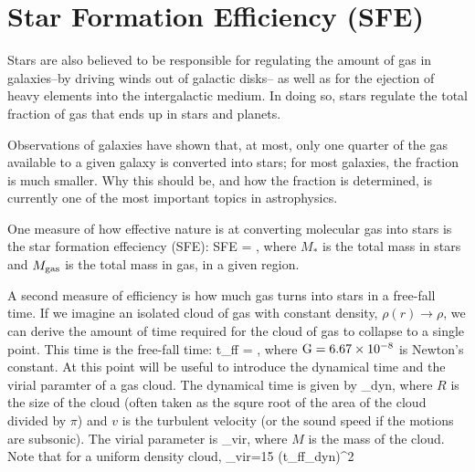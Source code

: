 \documentclass[../dissertation.tex]{subfiles}
\begin{document}


\section{Star Formation Efficiency (SFE)}

 Stars are also believed to be responsible for regulating the amount of gas in galaxies--by driving winds out of galactic disks-- as well as for the ejection of heavy elements into the intergalactic
medium.  In doing so, stars regulate the total fraction of gas that ends up in stars and planets. 
 
Observations of galaxies have shown that, at most, only one quarter of the gas available to a given galaxy is converted into stars; for most galaxies, the fraction is much smaller. 
Why this should be, and how the fraction is determined, is currently one of the most important topics in astrophysics.

One measure of how effective nature is at converting molecular gas into stars is the star formation effeciency (SFE):
%
\be
{\rm SFE} = ,
\ee
%
where $M_*$ is the total mass in stars and $M_{\rm gas}$ is the total mass in gas, in a given region.

A second measure of efficiency is how much gas turns into stars in a free-fall time. If we imagine an isolated cloud of gas with constant density, $\rho(r) \rightarrow \rho$, we can derive the amount of time required for the cloud of gas to collapse to a single point.
This time is the free-fall time:
%
\be
t_{\rm ff} = ,
\ee
%
where $ {\rm G} = 6.67 \times 10^{-8} $ is Newton's constant. At this point will be useful to introduce the dynamical time and the virial paramter of a gas cloud. The dynamical time is given by
%
\be
\tau_{\rm dyn},
\ee
%
where $R$ is the size of the cloud (often taken as the squre root of the area of the cloud divided by $\pi$) and $v$ is the turbulent velocity (or the sound speed if the motions are subsonic). The virial parameter is
%
\be
\alpha_{\rm vir},
\ee
%
where $M$ is the mass of the cloud. Note that for a uniform density cloud,
%
\be
\alpha_{\rm vir}={15\pi} \left({t_{\rm ff}\over \tau_{\rm dyn}}\right)^2
\ee
%
\end{document}
